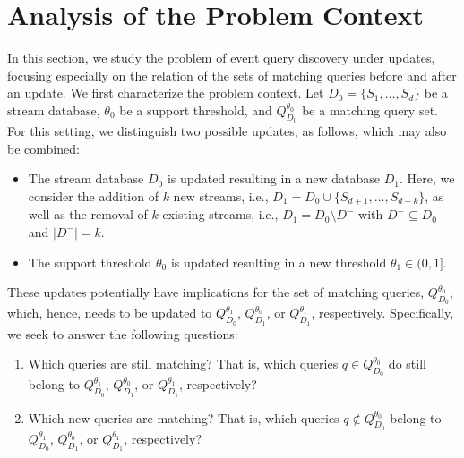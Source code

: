 \section{Analysis of the Problem Context}
\label{sec:updates}

In this section, we study the problem of event
query discovery under updates, focusing especially on
the relation of the sets of matching queries before
and after an update. We first characterize the problem
context. Let $D_0=\{S_1,\ldots, S_d\}$ be a stream
database,
$\theta_0$ be a support threshold, and
$Q_{D_0}^{\theta_0}$ be a matching query set. For this
setting, we distinguish two possible updates, as
follows, which may also be combined:
\begin{itemize}[nosep,left=.2em .. 1.5em]
  \item The stream database $D_0$ is updated resulting
  in a new database $D_1$. Here, we consider the
  addition of $k$ new
  streams, i.e., $D_1 = D_0 \cup \{S_{d+1}, \dots,
  S_{d+k}\}$, as well as the removal of $k$ existing
  streams, i.e., $D_1 = D_0 \setminus D^-$ with $D^-
  \subseteq D_0$ and $|D^-|=k$.
  \item The support threshold $\theta_0$ is updated
  resulting in a new threshold $\theta_1 \in (0,1]$.
\end{itemize}
These updates potentially have implications for the
set of matching queries, $Q_{D_0}^{\theta_0}$, which,
hence, needs to be updated to $Q_{D_0}^{\theta_1}$,
$Q_{D_1}^{\theta_0}$, or $Q_{D_1}^{\theta_1}$,
respectively. Specifically, we seek to
answer the following questions:
\begin{enumerate}[nosep,left=.2em .. 1.5em]
  \item Which queries are still matching? That is,
  which queries $q\in Q_{D_0}^{\theta_0}$ do still belong to
  $Q_{D_0}^{\theta_1}$,
  $Q_{D_1}^{\theta_0}$, or $Q_{D_1}^{\theta_1}$,
  respectively?
  \item Which new queries are matching? That is,
    which queries $q\notin Q_{D_0}^{\theta_0}$ belong to
    $Q_{D_0}^{\theta_1}$,
    $Q_{D_1}^{\theta_0}$, or $Q_{D_1}^{\theta_1}$,
    respectively?
\end{enumerate}


